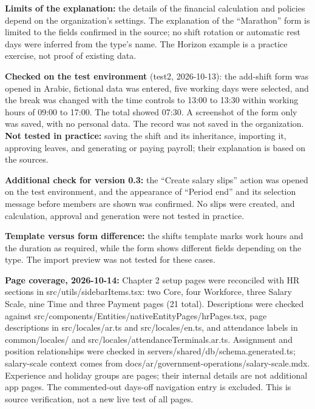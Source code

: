 \textbf{Limits of the explanation:} the details of the financial calculation and policies depend on the organization's settings.
The explanation of the “Marathon” form is limited to the fields confirmed in the source; no shift rotation
or automatic rest days were inferred from the type's name. The Horizon example is a practice exercise, not proof of existing data.

\textbf{Checked on the test environment} (test2, 2026-10-13): the add-shift form was opened
in Arabic, fictional data was entered, five working days were selected, and the break was changed
with the time controls to 13:00 to 13:30 within working hours of 09:00 to
17:00. The total showed 07:30. A screenshot of the form only was saved, with no personal data.
The record was not saved in the organization. \textbf{Not tested in practice:} saving the shift and its inheritance,
importing it, approving leaves, and generating or paying payroll; their explanation is based on the sources.

\textbf{Additional check for version 0.3:} the “Create salary slips” action was opened on the test
environment, and the appearance of “Period end” and its selection message before members are shown was confirmed.
No slips were created, and calculation, approval and generation were not tested in practice.

\textbf{Template versus form difference:} the shifts template marks work hours and the duration as required,
while the form shows different fields depending on the type. The import preview was not tested for these cases.


\textbf{Page coverage, 2026-10-14:} Chapter 2 setup pages were reconciled with HR sections in src/utils/sidebarItems.tsx: two Core, four Workforce, three Salary Scale, nine Time and three Payment pages (21 total). Descriptions were checked against src/components/Entities/nativeEntityPages/hrPages.tsx, page descriptions in src/locales/ar.ts and src/locales/en.ts, and attendance labels in common/locales/ and src/locales/attendanceTerminals.ar.ts. Assignment and position relationships were checked in servers/shared/db/schema.generated.ts; salary-scale context comes from docs/ar/government-operations/salary-scale.mdx. Experience and holiday groups are pages; their internal details are not additional app pages. The commented-out days-off navigation entry is excluded. This is source verification, not a new live test of all pages.

